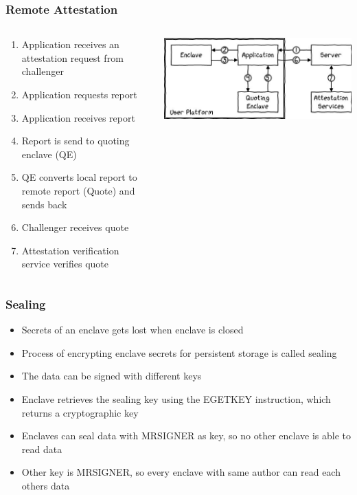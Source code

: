 \begin{frame}
    \frametitle{Remote Attestation}
    \begin{columns}
        \begin{column}{0.4\textwidth}
            \begin{enumerate}[<+->]
                \item Application receives an attestation request from challenger
                \item Application requests report
                \item Application receives report
                \item Report is send to quoting enclave (QE)
                \item QE converts local report to remote report (Quote) and sends back
                \item Challenger receives quote
                \item Attestation verification service verifies quote
            \end{enumerate}
        \end{column}
        \begin{column}{0.6\textwidth}
            \includegraphics[scale=0.4]{Images/remote_attestation.png}
        \end{column}
    \end{columns}
\end{frame}

\begin{frame}
    \frametitle{Sealing}
    \begin{itemize}[<+->]
        \item Secrets of an enclave gets lost when enclave is closed
        \item Process of encrypting enclave secrets for persistent storage is called sealing
        \item The data can be signed with different keys
        \item Enclave retrieves the sealing key using the EGETKEY instruction, which returns a cryptographic key
        \item Enclaves can seal data with MRSIGNER as key, so no other enclave is able to read data
        \item Other key is MRSIGNER, so every enclave with same author can read each others data
    \end{itemize}
\end{frame}